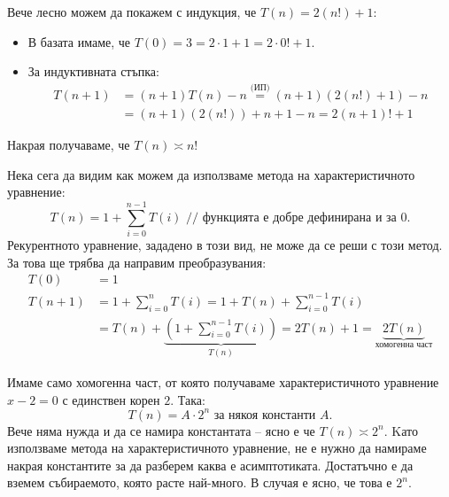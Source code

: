 Вече лесно можем да покажем с индукция, че $T(n) = 2(n!) + 1$:
\begin{itemize}
    \item В базата имаме, че $T(0) = 3 = 2 \cdot 1 + 1 = 2 \cdot 0! + 1$.
    \item За индуктивната стъпка:
          \begin{align*}
              T(n + 1) & = (n + 1)T(n) - n \stackrel{\text{(ИП)}}{=} (n + 1)(2(n!) + 1) - n \\
                       & = (n + 1)(2(n!)) + n + 1 - n = 2(n + 1)! + 1
          \end{align*}
\end{itemize}
Накрая получаваме, че $T(n) \asymp n!$

Нека сега да видим как можем да използваме метода на характеристичното уравнение:
\[
    T(n) = 1 + \sum\limits_{i = 0}^{n - 1}T(i)    \text{ // функцията е добре дефинирана и за } 0.
\]
Рекурентното уравнение, зададено в този вид, не може да се реши с този метод.
За това ще трябва да направим преобразувания:
\begin{align*}
    T(0)     & = 1                                                                                                                                      \\
    T(n + 1) & = 1 + \sum\limits_{i = 0}^{n}T(i) = 1 + T(n) + \sum\limits_{i = 0}^{n - 1}T(i)                                                           \\
             & = T(n) + \underbrace{\left( 1 + \sum\limits_{i = 0}^{n - 1}T(i) \right)}_{T(n)} = 2T(n) + 1 = \underbrace{2T(n)}_{\text{хомогенна част}}
\end{align*}

Имаме само хомогенна част, от която получаваме характеристичното уравнение $x - 2 = 0$ с единствен корен $2$.
Така:
\[
    T(n) = A \cdot 2^n \text{ за някоя константи } A.
\]
Вече няма нужда и да се намира константата -- ясно е че $T(n) \asymp 2^n$.
Kато използваме метода на характеристичното уравнение, не е нужно да намираме накрая константите за да разберем каква е асимптотиката.
Достатъчно е да вземем събираемото, която расте най-много. В случая е ясно, че това е $2^n$.

